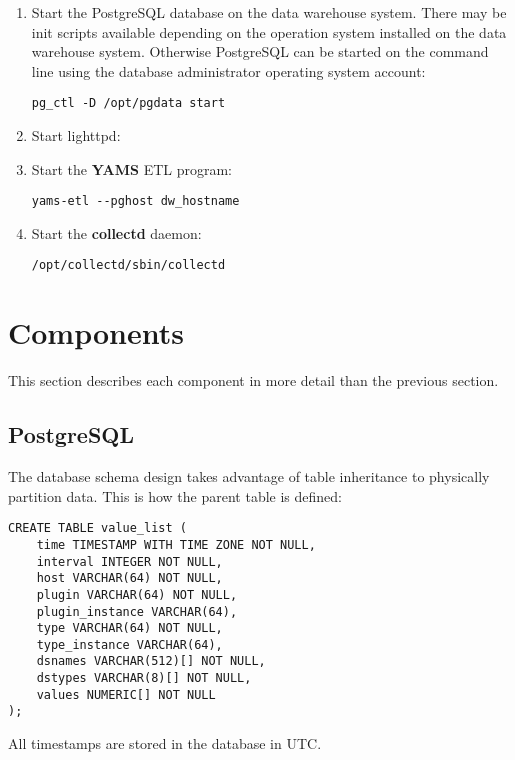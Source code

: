 \documentclass[a4paper,twoside,12pt]{article}
\begin{document}
\begin{enumerate}
  \item Start the PostgreSQL database on the data warehouse system.  There may
        be init scripts available depending on the operation system installed
        on the data warehouse system.  Otherwise PostgreSQL can be started on
        the command line using the database administrator operating system
        account:
        \lstset{language=sh}
        \begin{lstlisting}
pg_ctl -D /opt/pgdata start
        \end{lstlisting}
  \item Start lighttpd:
  \item Start the \textbf{YAMS} ETL program:
        \lstset{language=sh}
        \begin{lstlisting}
yams-etl --pghost dw_hostname
        \end{lstlisting}
  \item Start the \textbf{collectd} daemon:
        \lstset{language=sh}
        \begin{lstlisting}
/opt/collectd/sbin/collectd
        \end{lstlisting}
\end{enumerate}

\section{Components}

This section describes each component in more detail than the previous section.

\subsection{PostgreSQL}

The database schema design takes advantage of table inheritance to physically
partition data.  This is how the parent table is defined:
\lstset{language=sql}
\begin{lstlisting}
CREATE TABLE value_list (
    time TIMESTAMP WITH TIME ZONE NOT NULL,
    interval INTEGER NOT NULL,
    host VARCHAR(64) NOT NULL,
    plugin VARCHAR(64) NOT NULL,
    plugin_instance VARCHAR(64),
    type VARCHAR(64) NOT NULL,
    type_instance VARCHAR(64),
    dsnames VARCHAR(512)[] NOT NULL,
    dstypes VARCHAR(8)[] NOT NULL,
    values NUMERIC[] NOT NULL
);
\end{lstlisting}

All timestamps are stored in the database in UTC.
\end{document}
